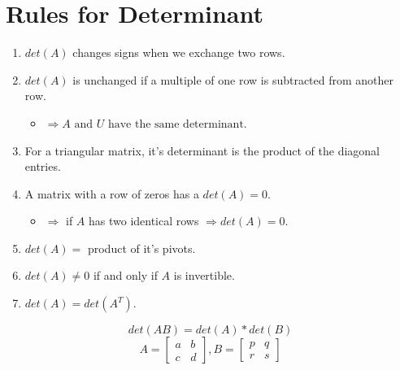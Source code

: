 \documentclass[12pt]{amsart}
\numberwithin{equation}{theorem}    %
\begin{document}
\section{Rules for Determinant}

\begin{enumerate}
    \item $det(A)$ changes signs when we exchange two rows.
    \item $det(A)$ is unchanged if a multiple of one row is subtracted from another row.
          \begin{itemize}
              \item $\Rightarrow A \text{ and } U \text{ have the same determinant}$.
          \end{itemize}
    \item For a triangular matrix, it's determinant is the product of the diagonal entries.
    \item A matrix with a row of zeros has a $det(A)=0$.
          \begin{itemize}
              \item $\Rightarrow$ if $A$ has two identical rows $\Rightarrow det(A)=0$.
          \end{itemize}
    \item $det(A)=$ product of it's pivots.
    \item $det(A)\neq 0$ if and only if $A$ is invertible.
    \item $det(A) = det(A^{T})$.
\end{enumerate}

\begin{theorem}
    $$det(AB) = det(A)*det(B)$$
    $$A = \begin{bmatrix}
            a & b \\
            c & d
        \end{bmatrix}, B=\begin{bmatrix}
            p & q \\
            r & s
        \end{bmatrix}$$

\end{theorem}
\end{document}
